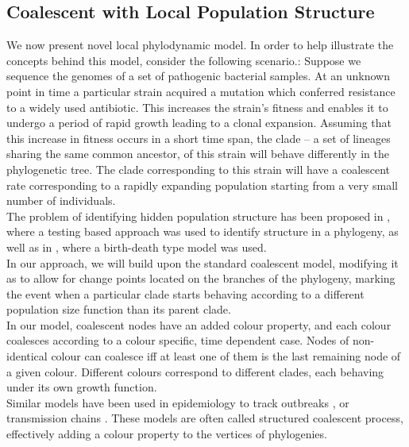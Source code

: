 \documentclass{ieeeaccess}
\theoremstyle{definition}
\begin{document}
\subsection{Coalescent with Local Population Structure}
We now present novel local phylodynamic model.
In order to help illustrate the concepts behind this model, consider the following scenario.:
Suppose we sequence the genomes of a set of pathogenic bacterial samples. 
At an unknown point in time a particular strain acquired a mutation which conferred resistance to a widely used antibiotic. This increases the strain's fitness and enables it to undergo a period of rapid growth leading to a clonal expansion. Assuming that this increase in fitness occurs in a short time span, the clade -- a set of lineages sharing the same common ancestor, of this strain will behave differently in the phylogenetic tree. The clade corresponding to this strain will have a coalescent rate corresponding to a rapidly expanding population starting from a very small number of individuals.\\
The problem of identifying hidden population structure has been proposed in \cite{volz_identification_nodate}, where a testing based approach was used to identify structure in a phylogeny, as well as in \cite{barido-sottani_multitype_2020}, where a birth-death type model was used.\\
In our approach, we will build upon the standard coalescent model, modifying it as to allow for change points located on the branches of the phylogeny, marking the event when a particular clade starts behaving according to a different population size function than its parent clade.\\
In our model, coalescent nodes have an added colour property, and each colour coalesces according to a colour specific, time dependent case. Nodes of non-identical colour can coalesce iff at least one of them is the last remaining node of a given colour.
Different colours correspond to different clades, each behaving under its own growth function.\\
Similar models have been used in epidemiology to track outbreaks \cite{maio_scotti_2016}, or transmission chains \cite{didelot_genomic_2017}.
These models are often called structured coalescent process, effectively adding a colour property to the vertices of phylogenies.
\end{document}
